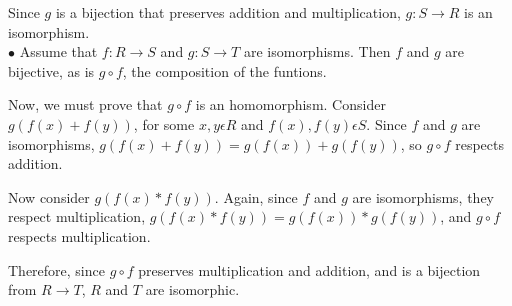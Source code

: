 \documentclass[a4paper,11pt]{article}
\begin{document}
Since $g$ is a bijection that preserves addition and multiplication, $g: S \rightarrow R$ is an isomorphism.\\

$\bullet$ Assume that $f: R \rightarrow S$ and $g: S \rightarrow T$ are isomorphisms. Then $f$ and $g$ are bijective, as is $g \circ f$, the composition of the funtions.

Now, we must prove that $g\circ f$ is an homomorphism. Consider $g(f(x)+f(y))$, for some $x,y\epsilon R$ and $f(x), f(y) \epsilon S$. Since $f$ and $g$ are isomorphisms, $g(f(x)+f(y)) = g(f(x)) + g(f(y))$, so $g\circ f$ respects addition. 

Now consider $g(f(x)*f(y))$. Again, since $f$ and $g$ are isomorphisms, they respect multiplication, $g(f(x)*f(y)) = g(f(x)) * g(f(y))$, and $g\circ f$ respects multiplication.

Therefore, since $g \circ f$ preserves multiplication and addition, and is a bijection from $R \rightarrow T$, $R$ and $T$ are isomorphic.
\end{document}
